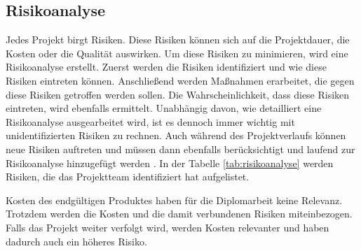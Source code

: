 \subsection{Risikoanalyse}

Jedes Projekt birgt Risiken. Diese Risiken können sich auf die Projektdauer, die Kosten oder die Qualität auswirken. Um diese Risiken zu minimieren, wird eine Risikoanalyse erstellt. Zuerst werden die Risiken identifiziert und wie diese Risiken eintreten können. Anschließend werden Maßnahmen erarbeitet, die gegen diese Risiken getroffen werden sollen. Die Wahrscheinlichkeit, dass diese Risiken eintreten, wird ebenfalls ermittelt. Unabhängig davon, wie detailliert eine Risikoanalyse ausgearbeitet wird, ist es dennoch immer wichtig mit unidentifizierten Risiken zu rechnen. Auch während des Projektverlaufs können neue Risiken auftreten und müssen dann ebenfalls berücksichtigt und laufend zur Risikoanalyse hinzugefügt werden . In der Tabelle \ref{tab:risikoanalyse} werden Risiken, die das Projektteam identifiziert hat aufgelistet.

Kosten des endgültigen Produktes haben für die Diplomarbeit keine Relevanz. Trotzdem werden die Kosten und die damit verbundenen Risiken miteinbezogen. Falls das Projekt weiter verfolgt wird, werden Kosten relevanter und haben dadurch auch ein höheres Risiko.

